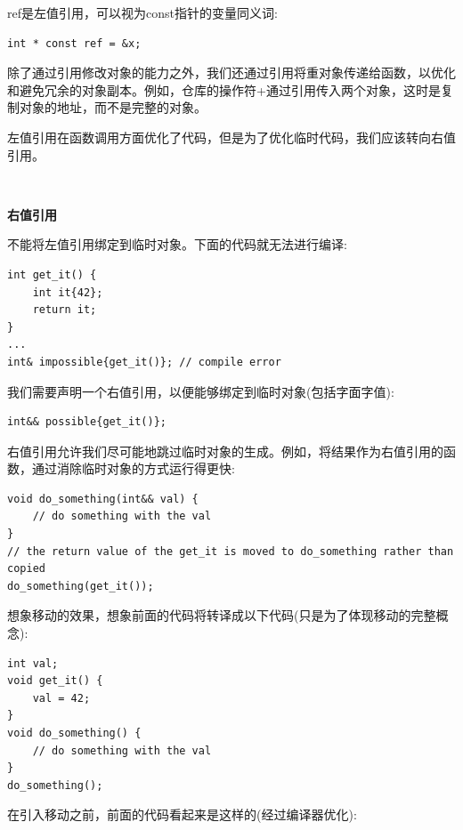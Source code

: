 ref是左值引用，可以视为const指针的变量同义词: \par

\begin{lstlisting}[caption={}]
int * const ref = &x;
\end{lstlisting}

除了通过引用修改对象的能力之外，我们还通过引用将重对象传递给函数，以优化和避免冗余的对象副本。例如，仓库的操作符+通过引用传入两个对象，这时是复制对象的地址，而不是完整的对象。 \par
左值引用在函数调用方面优化了代码，但是为了优化临时代码，我们应该转向右值引用。 \par

\noindent\textbf{}\ \par
\textbf{右值引用} \ \par
不能将左值引用绑定到临时对象。下面的代码就无法进行编译: \par

\begin{lstlisting}[caption={}]
int get_it() {
	int it{42};
	return it;
}
...
int& impossible{get_it()}; // compile error
\end{lstlisting}

我们需要声明一个右值引用，以便能够绑定到临时对象(包括字面字值): \par

\begin{lstlisting}[caption={}]
int&& possible{get_it()};
\end{lstlisting}

右值引用允许我们尽可能地跳过临时对象的生成。例如，将结果作为右值引用的函数，通过消除临时对象的方式运行得更快: \par

\begin{lstlisting}[caption={}]
void do_something(int&& val) {
	// do something with the val
}
// the return value of the get_it is moved to do_something rather than
copied
do_something(get_it());
\end{lstlisting}

想象移动的效果，想象前面的代码将转译成以下代码(只是为了体现移动的完整概念):\par

\begin{lstlisting}[caption={}]
int val;
void get_it() {
	val = 42;
}
void do_something() {
	// do something with the val
}
do_something();
\end{lstlisting}

在引入移动之前，前面的代码看起来是这样的(经过编译器优化):\par

